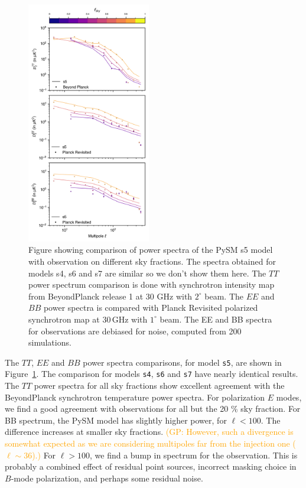 \documentclass[twocolumn]{aastex631}
\newcommand{\giuse}[1]{\textcolor{orange}{(GP: #1)}}
\begin{document}
\begin{figure}
   \centering
   \includegraphics[width=0.48\textwidth]{figures/Dlcomp_PySM3-4_s5_vs_BPPR_SYNC.png}
    \caption{Figure showing comparison of power spectra of the PySM s5 model with observation on different sky fractions. The spectra obtained for models s4, s6 and s7 are similar so we don't show them here. The $TT$ power spectrum comparison is done with synchrotron intensity map from BeyondPlanck release 1 \citep{Andersen:2023} at 30 GHz with $2^\circ$ beam. The $EE$ and $BB$ power spectra is compared with Planck Revisited \citep{Delabrouille:2024} polarized synchrotron map at 30\,GHz with $1^\circ$ beam. The EE and BB spectra for observations are debiased for noise, computed from 200 simulations.}
   \label{fig:Dl_sync_galmask}
\end{figure}

The $TT$, $EE$ and $BB$ power spectra comparisons, for model \texttt{s5}, are shown in Figure~\ref{fig:Dl_sync_galmask}. The comparison for models \texttt{s4}, \texttt{s6} and \texttt{s7} have nearly identical results. The $TT$ power spectra for all sky fractions show excellent agreement with the BeyondPlanck synchrotron temperature power spectra. For polarization $E$ modes, we find a good agreement with observations for all but the 20 \% sky fraction. 
For BB spectrum, the PySM model has slightly higher power, for $\ell < 100$. The difference increases at smaller sky fractions. 
\giuse{However, such a divergence is somewhat expected as we are considering multipoles far from the injection one ($\ell\sim36$).} 
For $\ell > 100$, we find a bump in spectrum for the observation. This is probably a combined effect of residual point sources, incorrect masking choice in $B$-mode polarization, and perhaps some residual noise.
\end{document}
